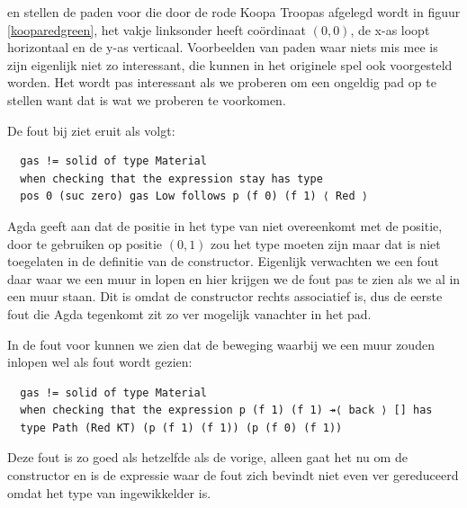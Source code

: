 
 en  stellen de paden voor die door de
rode Koopa Troopas afgelegd wordt in figuur \ref{kooparedgreen}, het vakje
linksonder heeft coördinaat $(0,0)$, de x-as loopt horizontaal en de y-as
verticaal. Voorbeelden van paden waar niets mis mee is zijn eigenlijk niet zo
interessant, die kunnen in het originele spel ook voorgesteld worden. Het wordt
pas interessant als we proberen om een ongeldig pad op te stellen want dat is
wat we proberen te voorkomen.


De fout bij  ziet eruit als volgt:

\begin{verbatim}
  gas != solid of type Material
  when checking that the expression stay has type
  pos 0 (suc zero) gas Low follows p (f 0) (f 1) ⟨ Red ⟩
\end{verbatim}

Agda geeft aan dat de positie in het type van  niet overeenkomt met
de positie, door  te gebruiken op positie $(0,1)$ zou het type
 moeten
zijn maar dat is niet toegelaten in de definitie van de constructor.
Eigenlijk verwachten we een fout daar waar we een muur in lopen en hier krijgen
we de fout pas te zien als we al in een muur staan. Dit is omdat de
 constructor rechts associatief is, dus de eerste fout die Agda
tegenkomt zit zo ver mogelijk vanachter in het pad.

In de fout voor  kunnen we zien dat de beweging waarbij
we een muur zouden inlopen wel als fout wordt gezien:

\begin{verbatim}
  gas != solid of type Material
  when checking that the expression p (f 1) (f 1) ↠⟨ back ⟩ [] has
  type Path (Red KT) (p (f 1) (f 1)) (p (f 0) (f 1))
\end{verbatim}

Deze fout is zo goed als hetzelfde als de vorige, alleen gaat het nu om de
 constructor en is de expressie waar de fout zich bevindt niet even
ver gereduceerd omdat het type van  ingewikkelder is.

